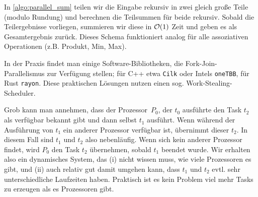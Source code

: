 In \cref{algo:parallel_sum} teilen wir die Eingabe rekursiv in zwei gleich große Teile (modulo Rundung) und berechnen die Teilsummen für beide rekursiv.
Sobald die Teilergebnisse vorliegen, summieren wir diese in $\mathcal{O}\!\left(1\right)$ Zeit und geben es als Gesamtergebnis zurück.
Dieses Schema funktioniert analog für alle assoziativen Operationen (z.B. Produkt, Min, Max).

In der Praxis findet man einige Software-Bibliotheken, die Fork-Join-Parallelismus zur Verfügung stellen;
für C++ etwa \texttt{Cilk} oder Intels \texttt{oneTBB}, für Rust \texttt{rayon}.
Diese praktischen Lösungen nutzen einen sog. Work-Stealing-Scheduler.

Grob  kann man annehmen, dass der Prozessor~$P_0$, der $t_0$ ausführte den Task $t_2$ als verfügbar bekannt gibt und dann selbst $t_1$ ausführt.
Wenn während der Ausführung von $t_1$ ein anderer Prozessor verfügbar ist, übernimmt dieser $t_2$.
In diesem Fall sind $t_1$ und $t_2$ also nebenläufig.
Wenn sich kein anderer Prozessor findet, wird $P_0$ den Task $t_2$ übernehmen, sobald $t_1$ beendet wurde.
Wir erhalten also ein dynamisches System, das (i) nicht wissen muss, wie viele Prozessoren es gibt, und (ii) auch relativ gut damit umgehen kann, dass $t_1$ und $t_2$ evtl. sehr unterschiedliche Laufzeiten haben.
Praktisch ist es kein Problem viel mehr Tasks zu erzeugen als es Prozessoren gibt.

